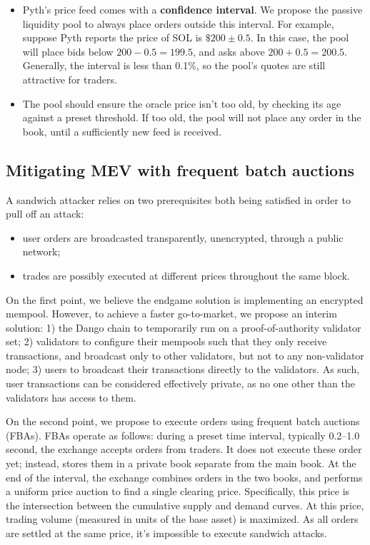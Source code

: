 \documentclass{article}
\begin{document}
\begin{itemize}
  \item Pyth's price feed comes with a \textbf{confidence interval}.\supercite{pythconfidenceinterval} We propose the passive liquidity pool to always place orders outside this interval. For example, suppose Pyth reports the price of SOL is $\$200 \pm 0.5$. In this case, the pool will place bids below $200 - 0.5 = 199.5$, and asks above $200 + 0.5 = 200.5$. Generally, the interval is less than 0.1\%, so the pool's quotes are still attractive for traders.
  \item The pool should ensure the oracle price isn't too old, by checking its age against a preset threshold. If too old, the pool will not place any order in the book, until a sufficiently new feed is received.
\end{itemize}

\subsection{Mitigating MEV with frequent batch auctions}

A sandwich attacker relies on two prerequisites both being satisfied in order to pull off an attack:

\begin{itemize}
  \item user orders are broadcasted transparently, unencrypted, through a public network;
  \item trades are possibly executed at different prices throughout the same block.
\end{itemize}

On the first point, we believe the endgame solution is implementing an encrypted mempool.\supercite{encryptedmempool} However, to achieve a faster go-to-market, we propose an interim solution: 1) the Dango chain to temporarily run on a proof-of-authority validator set; 2) validators to configure their mempools such that they only receive transactions, and broadcast only to other validators, but not to any non-validator node; 3) users to broadcast their transactions directly to the validators. As such, user transactions can be considered effectively private, as no one other than the validators has access to them.

On the second point, we propose to execute orders using frequent batch auctions (FBAs).\supercite{frequentbatchauctions} FBAs operate as follows: during a preset time interval, typically 0.2--1.0 second, the exchange accepts orders from traders. It does not execute these order yet; instead, stores them in a private book separate from the main book. At the end of the interval, the exchange combines orders in the two books, and performs a uniform price auction to find a single clearing price. Specifically, this price is the intersection between the cumulative supply and demand curves. At this price, trading volume (measured in units of the base asset) is maximized. As all orders are settled at the same price, it's impossible to execute sandwich attacks.
\end{document}

